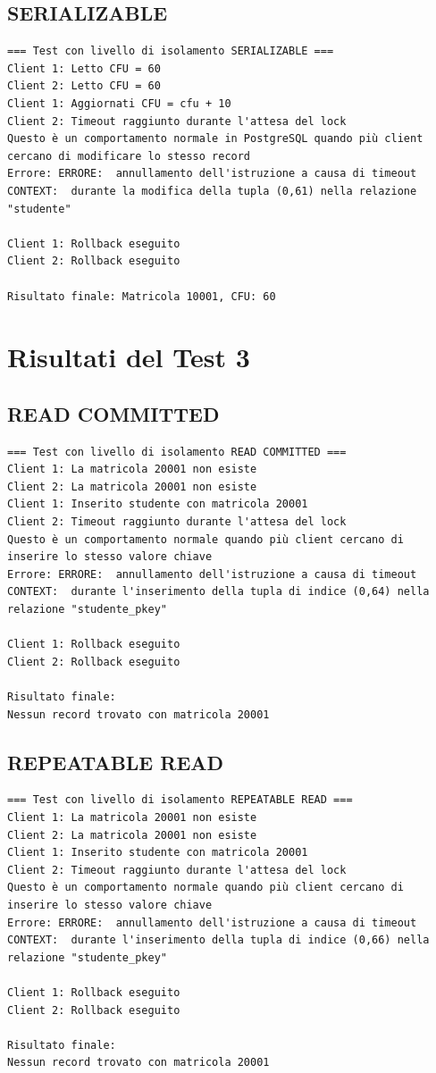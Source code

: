 \documentclass[a4paper,12pt]{report}
\begin{document}
\subsection{SERIALIZABLE}
\begin{verbatim}
=== Test con livello di isolamento SERIALIZABLE ===
Client 1: Letto CFU = 60
Client 2: Letto CFU = 60
Client 1: Aggiornati CFU = cfu + 10
Client 2: Timeout raggiunto durante l'attesa del lock
Questo è un comportamento normale in PostgreSQL quando più client cercano di modificare lo stesso record
Errore: ERRORE:  annullamento dell'istruzione a causa di timeout
CONTEXT:  durante la modifica della tupla (0,61) nella relazione "studente"

Client 1: Rollback eseguito
Client 2: Rollback eseguito

Risultato finale: Matricola 10001, CFU: 60
\end{verbatim}

\section{Risultati del Test 3}

\subsection{READ COMMITTED}
\begin{verbatim}
=== Test con livello di isolamento READ COMMITTED ===
Client 1: La matricola 20001 non esiste
Client 2: La matricola 20001 non esiste
Client 1: Inserito studente con matricola 20001
Client 2: Timeout raggiunto durante l'attesa del lock
Questo è un comportamento normale quando più client cercano di inserire lo stesso valore chiave
Errore: ERRORE:  annullamento dell'istruzione a causa di timeout
CONTEXT:  durante l'inserimento della tupla di indice (0,64) nella relazione "studente_pkey"

Client 1: Rollback eseguito
Client 2: Rollback eseguito

Risultato finale:
Nessun record trovato con matricola 20001
\end{verbatim}

\subsection{REPEATABLE READ}
\begin{verbatim}
=== Test con livello di isolamento REPEATABLE READ ===
Client 1: La matricola 20001 non esiste
Client 2: La matricola 20001 non esiste
Client 1: Inserito studente con matricola 20001
Client 2: Timeout raggiunto durante l'attesa del lock
Questo è un comportamento normale quando più client cercano di inserire lo stesso valore chiave
Errore: ERRORE:  annullamento dell'istruzione a causa di timeout
CONTEXT:  durante l'inserimento della tupla di indice (0,66) nella relazione "studente_pkey"

Client 1: Rollback eseguito
Client 2: Rollback eseguito

Risultato finale:
Nessun record trovato con matricola 20001
\end{verbatim}
\end{document}
